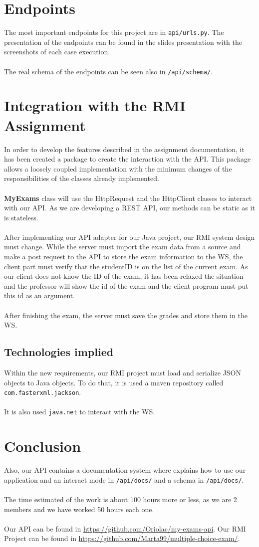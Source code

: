 \documentclass{article}
\begin{document}
\section{Endpoints}
The most important endpoints for this project are in \texttt{api/urls.py}. The presentation of the endpoints can be found in the slides presentation with the screenshots of each case execution.
\\
\\
The real schema of the endpoints can be seen also in \texttt{/api/schema/}.
\section{Integration with the RMI Assignment}
In order to develop the features described in the assignment documentation, it has been created a package to create the interaction with the API. This package allows a loosely coupled implementation with the minimum changes of the responsibilities of the classes already implemented.
\\\\
\textbf{MyExams }class will use the HttpRequest and the HttpClient classes to interact with our API. As we are developing a REST API, our methods can be static as it is stateless.
\\\\
After implementing our API adapter for our Java project, our RMI system design must change. While the server must import the exam data from a source and make a post request to the API to store the exam information to the WS, the client part must verify that the studentID is on the list of the current exam. As our client does not know the ID of the exam, it has been relaxed the situation and the professor will show the id of the exam and the client program must put this id as an argument.
\\
\\
After finishing the exam, the server must save the grades and store them in the WS.
\subsection{Technologies implied}
Within the new requirements, our RMI project must load and serialize JSON objects to Java objects. To do that, it is used a maven repository called \texttt{com.fasterxml.jackson}.
\\
\\
It is also used \texttt{java.net} to interact with the WS.
\section{Conclusion}
Also, our API contains a documentation system where explains how to use our application and an interact mode in \texttt{/api/docs/} and a schema in \texttt{/api/docs/}.\\\\
The time estimated of the work is about 100 hours more or less, as we are 2 members and we have worked 50 hours each one.\\\\
Our API can be found in \url{https://github.com/Oriolac/my-exams-api}. Our RMI Project can be found in \url{https://github.com/Marta99/multiple-choice-exam/}.
\end{document}
